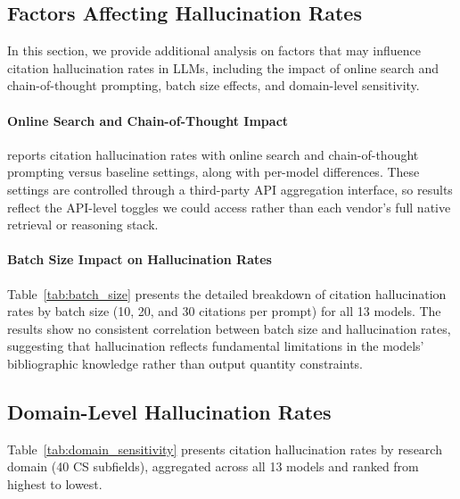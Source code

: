 \subsection{Factors Affecting Hallucination Rates}

In this section, we provide additional analysis on factors that may influence citation hallucination rates in LLMs, including the impact of online search and chain-of-thought prompting, batch size effects, and domain-level sensitivity.

\paragraph{Online Search and Chain-of-Thought Impact}
\label{app:online_impact}

 reports citation hallucination rates with online search and chain-of-thought prompting versus baseline settings, along with per-model differences.
These settings are controlled through a third-party API aggregation interface, so results reflect the API-level toggles we could access rather than each vendor's full native retrieval or reasoning stack.


\paragraph{Batch Size Impact on Hallucination Rates}

% 

\label{app:batch_size}



Table~\ref{tab:batch_size} presents the detailed breakdown of citation hallucination rates by batch size (10, 20, and 30 citations per prompt) for all 13 models.
The results show no consistent correlation between batch size and hallucination rates, suggesting that hallucination reflects fundamental limitations in the models' bibliographic knowledge rather than output quantity constraints.

% 

\subsection{Domain-Level Hallucination Rates}
\label{app:domain_sensitivity}



Table~\ref{tab:domain_sensitivity} presents citation hallucination rates by research domain (40 CS subfields), aggregated across all 13 models and ranked from highest to lowest.

